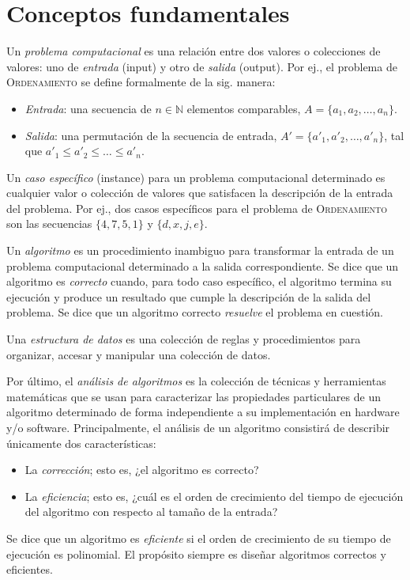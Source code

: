 \chapter{Conceptos fundamentales}

Un \emph{problema computacional} es una relación entre dos valores o colecciones de valores: uno de \emph{entrada} (input) y otro de \emph{salida} (output). Por ej., el problema de \textsc{Ordenamiento} se define formalmente de la sig. manera:
\begin{itemize}
  \item \emph{Entrada}: una secuencia de \(n\in\mathbb{N}\) elementos comparables, \(A=\{a_1,a_2,\dots,a_n\}\).
  \item \emph{Salida}: una permutación de la secuencia de entrada, \(A'=\{a'_1,a'_2,\dots,a'_n\}\), tal que \(a'_1\leq a'_2\leq\dots\leq a'_n\).
\end{itemize}
Un \emph{caso específico} (instance) para un problema computacional determinado es cualquier valor o colección de valores que satisfacen la descripción de la entrada del problema. 
Por ej., dos casos específicos para el problema de \textsc{Ordenamiento} son las secuencias \(\{4,7,5,1\}\) y \(\{d,x,j,e\}\).

Un \emph{algoritmo} es un procedimiento inambiguo para transformar la entrada de un problema computacional determinado a la salida correspondiente.
Se dice que un algoritmo es \emph{correcto} cuando, para todo caso específico, el algoritmo termina su ejecución y produce un resultado que cumple la descripción de la salida del problema.
Se dice que un algoritmo correcto \emph{resuelve} el problema en cuestión.

Una \emph{estructura de datos} es una colección de reglas y procedimientos para organizar, accesar y manipular una colección de datos.

Por último,  el \emph{análisis de algoritmos} es la colección de técnicas y herramientas matemáticas que se usan para caracterizar las propiedades particulares de un algoritmo determinado de forma independiente a su implementación en hardware y/o software. 
Principalmente, el análisis de un algoritmo consistirá de describir únicamente dos características:

\begin{itemize}
  \item La \emph{corrección}; esto es, ¿el algoritmo es correcto?
  \item La \emph{eficiencia}; esto es, ¿cuál es el orden de crecimiento del 
  tiempo de ejecución del algoritmo con respecto al tamaño de la entrada?
\end{itemize}
Se dice que un algoritmo es \emph{eficiente}  si el orden de crecimiento
de su tiempo de ejecución es polinomial. 
El propósito siempre es diseñar algoritmos correctos y eficientes.
